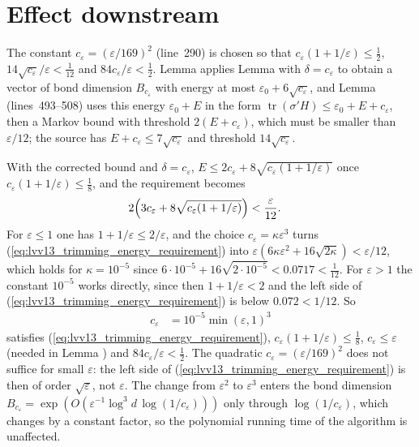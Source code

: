 \documentclass{article}
\begin{document}
\section{Effect downstream}

The constant $c_\varepsilon=(\varepsilon/169)^2$ (line~290) is chosen so
that $c_\varepsilon(1+1/\varepsilon)\le\frac12$,
$14\sqrt{c_\varepsilon}/\varepsilon<\frac1{12}$ and
$84c_\varepsilon/\varepsilon<\frac12$. Lemma  applies
Lemma  with $\delta=c_\varepsilon$ to obtain a vector of bond
dimension $B_{c_\varepsilon}$ with energy at most
$\varepsilon_0+6\sqrt{c_\varepsilon}$, and Lemma 
(lines~493--508) uses this energy $\varepsilon_0+E$ in the form
$\operatorname{tr}(\sigma'H)\le\varepsilon_0+E+c_\varepsilon$, then a
Markov bound with threshold $2(E+c_\varepsilon)$, which must be smaller than
$\varepsilon/12$; the source has $E+c_\varepsilon\le7\sqrt{c_\varepsilon}$
and threshold $14\sqrt{c_\varepsilon}$.

With the corrected bound and $\delta=c_\varepsilon$,
$E\le2c_\varepsilon+8\sqrt{c_\varepsilon(1+1/\varepsilon)}$ once
$c_\varepsilon(1+1/\varepsilon)\le\frac18$, and the requirement becomes
\begin{align}
    2\Bigl(3c_\varepsilon+8\sqrt{c_\varepsilon(1+1/\varepsilon)}\Bigr)
     & <\frac{\varepsilon}{12}.
    \label{eq:lvv13_trimming_energy_requirement}
\end{align}
For $\varepsilon\le1$ one has $1+1/\varepsilon\le2/\varepsilon$, and the
choice $c_\varepsilon=\kappa\varepsilon^3$ turns
(\ref{eq:lvv13_trimming_energy_requirement}) into
$\varepsilon(6\kappa\varepsilon^2+16\sqrt{2\kappa})<\varepsilon/12$, which
holds for $\kappa=10^{-5}$ since $6\cdot10^{-5}+16\sqrt{2\cdot10^{-5}}
<0.0717<\frac1{12}$. For $\varepsilon>1$ the constant $10^{-5}$ works
directly, since then $1+1/\varepsilon<2$ and the left side of
(\ref{eq:lvv13_trimming_energy_requirement}) is below $0.072<1/12$. So
\begin{align}
    c_\varepsilon & =10^{-5}\min(\varepsilon,1)^3
    \label{eq:lvv13_trimming_energy_new_constant}
\end{align}
satisfies (\ref{eq:lvv13_trimming_energy_requirement}),
$c_\varepsilon(1+1/\varepsilon)\le\frac18$, $c_\varepsilon\le\varepsilon$ (needed
in Lemma ) and $84c_\varepsilon/\varepsilon<\frac12$.
The quadratic $c_\varepsilon=(\varepsilon/169)^2$ does not suffice for
small $\varepsilon$: the left side of
(\ref{eq:lvv13_trimming_energy_requirement}) is then of order
$\sqrt\varepsilon$, not $\varepsilon$. The change from $\varepsilon^2$ to
$\varepsilon^3$ enters the bond dimension $B_{c_\varepsilon}=
\exp(O(\varepsilon^{-1}\log^3d\,\log(1/c_\varepsilon)))$ only through
$\log(1/c_\varepsilon)$, which changes by a constant factor, so the
polynomial running time of the algorithm is unaffected.
\end{document}
